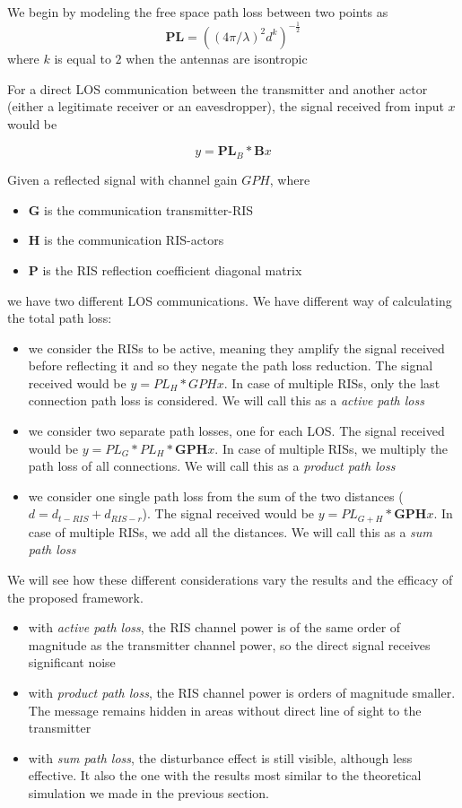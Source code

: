 We begin by modeling the free space path loss \cite{Free_space_path_loss} between two points as
\begin{equation}
  \bm{PL} = ((4 \pi / \lambda)^2 d^k)^{-\frac{1}{2}}
\end{equation}
where $k$ is equal to $2$ when the antennas are isontropic %

For a direct LOS communication between the transmitter and another actor (either a legitimate receiver or an eavesdropper), the signal received from input $x$ would be

\begin{equation}
  y = \bm{PL}_B * \bm{B}x
\end{equation}

Given a reflected signal with channel gain $GPH$, where
\begin{itemize}
  \item $\bm{G}$ is the communication transmitter-RIS
  \item $\bm{H}$ is the communication RIS-actors
  \item $\bm{P}$ is the RIS reflection coefficient diagonal matrix
\end{itemize}
we have two different LOS communications. We have different way of calculating the total path loss:
\begin{itemize}
  \item we consider the RISs to be active, meaning they amplify the signal received before reflecting it and so they negate the path loss reduction. The signal received would be $y = PL_H * GPHx$. In case of multiple RISs, only the last connection path loss is considered. We will call this as a \textit{active path loss}
  \item we consider two separate path losses, one for each LOS. The signal received would be $y = PL_G * PL_H * \bm{GPH}x$. In case of multiple RISs, we multiply the path loss of all connections. We will call this as a \textit{product path loss}
  \item we consider one single path loss from the sum of the two distances ($d = d_{t-RIS} + d_{RIS-r}$). The signal received would be $y = PL_{G+H} * \bm{GPH}x$. In case of multiple RISs, we add all the distances. We will call this as a \textit{sum path loss}
\end{itemize}

We will see how these different considerations vary the results and the efficacy of the proposed framework.
\begin{itemize}
  \item with \textit{active path loss}, the RIS channel power is of the same order of magnitude as the transmitter channel power, so the direct signal receives significant noise
  \item with \textit{product path loss}, the RIS channel power is orders of magnitude smaller. The message remains hidden in areas without direct line of sight to the transmitter
  \item with \textit{sum path loss}, the disturbance effect is still visible, although less effective. It also the one with the results most similar to the theoretical simulation we made in the previous section.
\end{itemize}

